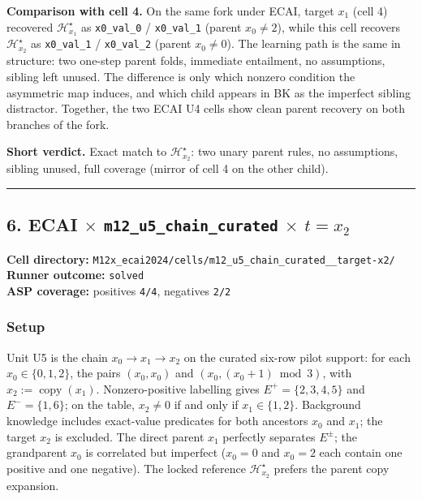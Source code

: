 \documentclass[11pt]{article}
\begin{document}
\textbf{Comparison with cell 4.} On the same fork under ECAI, target \(x_1\) (cell 4) recovered \(\mathcal{H}_{x_1}^\star\) as \texttt{x0\_val\_0} / \texttt{x0\_val\_1} (parent \(x_0\neq 2\)), while this cell recovers \(\mathcal{H}_{x_2}^\star\) as \texttt{x0\_val\_1} / \texttt{x0\_val\_2} (parent \(x_0\neq 0\)). The learning path is the same in structure: two one-step parent folds, immediate entailment, no assumptions, sibling left unused. The difference is only which nonzero condition the asymmetric map induces, and which child appears in BK as the imperfect sibling distractor. Together, the two ECAI U4 cells show clean parent recovery on both branches of the fork.

\textbf{Short verdict.} Exact match to \(\mathcal{H}_{x_2}^\star\): two unary parent rules, no assumptions, sibling unused, full coverage (mirror of cell 4 on the other child).

\medskip\hrule\medskip

\subsection{\texorpdfstring{6. ECAI \(\times\) \texttt{m12\_u5\_chain\_curated} \(\times\) \(t=x_2\)}{6. ECAI - m12-u5-chain-curated - target x2}}

\textbf{Cell directory:} \texttt{M12x\_ecai2024/cells/m12\_u5\_chain\_curated\_\_target-x2/}\\
\textbf{Runner outcome:} \texttt{solved}\\
\textbf{ASP coverage:} positives \texttt{4/4}, negatives \texttt{2/2}

\subsubsection{Setup}

Unit U5 is the chain \(x_0\to x_1\to x_2\) on the curated six-row pilot support: for each \(x_0\in\{0,1,2\}\), the pairs \((x_0,x_0)\) and \((x_0,(x_0+1)\bmod 3)\), with \(x_2:=\operatorname{copy}(x_1)\). Nonzero-positive labelling gives \(E^+=\{2,3,4,5\}\) and \(E^-=\{1,6\}\); on the table, \(x_2\neq 0\) if and only if \(x_1\in\{1,2\}\). Background knowledge includes exact-value predicates for both ancestors \(x_0\) and \(x_1\); the target \(x_2\) is excluded. The direct parent \(x_1\) perfectly separates \(E^\pm\); the grandparent \(x_0\) is correlated but imperfect (\(x_0=0\) and \(x_0=2\) each contain one positive and one negative). The locked reference \(\mathcal{H}_{x_2}^\star\) prefers the parent copy expansion.
\end{document}
